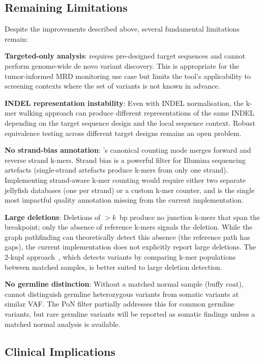 \subsection{Remaining Limitations}
\label{sec:discussion-limitations}

Despite the improvements described above, several fundamental limitations remain:

\textbf{Targeted-only analysis}: \kmerdet{} requires pre-designed target
sequences and cannot perform genome-wide de novo variant discovery.  This is
appropriate for the tumor-informed MRD monitoring use case but limits the tool's
applicability to screening contexts where the set of variants is not known in advance.

\textbf{INDEL representation instability}: Even with INDEL normalisation, the
k-mer walking approach can produce different representations of the same INDEL
depending on the target sequence design and the local sequence context.  Robust
equivalence testing across different target designs remains an open problem.

\textbf{No strand-bias annotation}: \jf{}'s canonical counting mode merges
forward and reverse strand k-mers.  Strand bias is a powerful filter for
Illumina sequencing artefacts (single-strand artefacts produce k-mers from
only one strand).  Implementing strand-aware k-mer counting would require either
two separate jellyfish databases (one per strand) or a custom k-mer counter,
and is the single most impactful quality annotation missing from the current
implementation.

\textbf{Large deletions}: Deletions of $>k$~bp produce no junction k-mers that
span the breakpoint; only the absence of reference k-mers signals the deletion.
While the graph pathfinding can theoretically detect this absence (the reference
path has gaps), the current implementation does not explicitly report large
deletions.  The 2-kupl approach~\cite{pelletier2021kupl}, which detects variants
by comparing k-mer populations between matched samples, is better suited to large
deletion detection.

\textbf{No germline distinction}: Without a matched normal sample (buffy coat),
\kmerdet{} cannot distinguish germline heterozygous variants from somatic
variants at similar VAF.  The PoN filter partially addresses this for common
germline variants, but rare germline variants will be reported as somatic findings
unless a matched normal analysis is available.

\subsection{Clinical Implications}
\label{sec:discussion-clinical}

